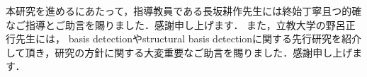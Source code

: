 本研究を進めるにあたって，指導教員である長坂耕作先生には終始丁寧且つ的確なご指導とご助言を賜りました．感謝申し上げます．
また，立教大学の野呂正行先生には，\groebner{} basis detectionやstructural \groebner{} basis detectionに関する先行研究を紹介して頂き，研究の方針に関する大変重要なご助言を賜りました．感謝申し上げます．
